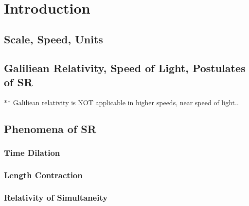 
\section{Introduction}

\subsection{Scale, Speed, Units}

\subsection{Galiliean Relativity, Speed of Light, Postulates of SR}
** Galiliean relativity is NOT applicable in higher speeds, near speed of light.. 

\subsection{Phenomena of SR}
\subsubsection{Time Dilation}
\subsubsection{Length Contraction}
\subsubsection{Relativity of Simultaneity}

\cite{taylor}